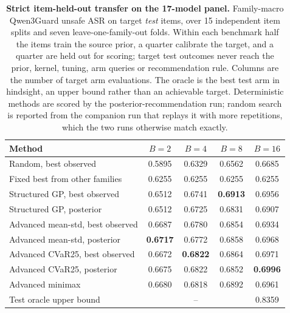 \begin{table}[t]
\centering
\small
\caption{\textbf{Strict item-held-out transfer on the 17-model panel.} Family-macro Qwen3Guard
unsafe ASR on target \emph{test} items, over 15 independent item splits and seven
leave-one-family-out folds. Within each benchmark half the items train the source prior, a quarter
calibrate the target, and a quarter are held out for scoring; target test outcomes never reach the
prior, kernel, tuning, arm queries or recommendation rule. Columns are the number of target arm
evaluations. The oracle is the best test arm in hindsight, an upper bound rather than an achievable
target. Deterministic methods are scored by the posterior-recommendation run; random search is
reported from the companion run that replays it with more repetitions, which the two runs otherwise
match exactly.}
\label{tab:confirm_strict}
\begin{tabular}{lcccc}
\toprule
Method & $B{=}2$ & $B{=}4$ & $B{=}8$ & $B{=}16$ \\
\midrule
Random, best observed & 0.5895 & 0.6329 & 0.6562 & 0.6685 \\
Fixed best from other families & 0.6255 & 0.6255 & 0.6255 & 0.6255 \\
Structured GP, best observed & 0.6512 & 0.6741 & \textbf{0.6913} & 0.6956 \\
Structured GP, posterior & 0.6512 & 0.6725 & 0.6831 & 0.6907 \\
Advanced mean-std, best observed & 0.6687 & 0.6780 & 0.6854 & 0.6934 \\
Advanced mean-std, posterior & \textbf{0.6717} & 0.6772 & 0.6858 & 0.6968 \\
Advanced CVaR25, best observed & 0.6672 & \textbf{0.6822} & 0.6864 & 0.6971 \\
Advanced CVaR25, posterior & 0.6675 & 0.6822 & 0.6852 & \textbf{0.6996} \\
Advanced minimax & 0.6680 & 0.6818 & 0.6892 & 0.6961 \\
\midrule
Test oracle upper bound & \multicolumn{3}{c}{--} & 0.8359 \\
\bottomrule
\end{tabular}
\end{table}
